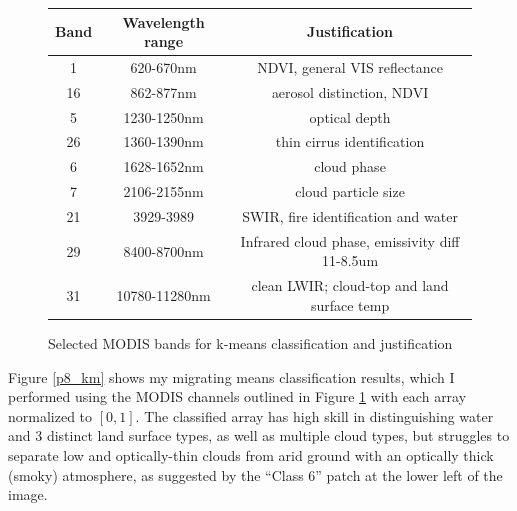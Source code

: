 \documentclass[12pt]{article}
\begin{document}
\begin{figure}[h!]
    \centering

    \begin{tabular}{c | c | c}
        Band & Wavelength range & Justification \\
        \hline
        1     & 620-670nm      & NDVI, general VIS reflectance \\
        16    & 862-877nm      & aerosol distinction, NDVI \\
        5     & 1230-1250nm    & optical depth \\
        26    & 1360-1390nm    & thin cirrus identification \\
        6     & 1628-1652nm    & cloud phase \\
        7     & 2106-2155nm    & cloud particle size \\
        21    & 3929-3989      & SWIR, fire identification and water \\
        29    & 8400-8700nm    & Infrared cloud phase, emissivity diff 11-8.5um \\
        31    & 10780-11280nm  & clean LWIR; cloud-top and land surface temp\\
    \end{tabular}
    \caption{Selected MODIS bands for k-means classification and justification}
    \label{p8_just}
\end{figure}

Figure \ref{p8_km} shows my migrating means classification results, which I performed using the MODIS channels outlined in Figure \ref{p8_just} with each array normalized to $[0,1]$. The classified array has high skill in distinguishing water and 3 distinct land surface types, as well as multiple cloud types, but struggles to separate low and optically-thin clouds from arid ground with an optically thick (smoky) atmosphere, as suggested by the ``Class 6'' patch at the lower left of the image.

\clearpage
\end{document}
